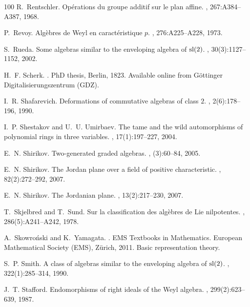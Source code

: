 \documentclass{commat}
\begin{document}
\begin{thebibliography}{100}
R.~Rentschler.
\newblock Op\'{e}rations du groupe additif sur le plan affine.
, 267:A384--A387, 1968.

P.~Revoy.
\newblock Alg\`ebres de {W}eyl en caract\'{e}ristique {$p$}.
, 276:A225--A228, 1973.

S.~Rueda.
\newblock Some algebras similar to the enveloping algebra of {$\rm sl(2)$}.
, 30(3):1127--1152, 2002.

H.~F. Scherk.
.
\newblock PhD thesis, Berlin, 1823.
\newblock Available online from G{\"o}ttinger Digitalisierungszentrum (GDZ).

I.~R. Shafarevich.
\newblock Deformations of commutative algebras of class {$2$}.
, 2(6):178--196, 1990.

I.~P. Shestakov and U.~U. Umirbaev.
\newblock The tame and the wild automorphisms of polynomial rings in three
  variables.
, 17(1):197--227, 2004.

E.~N. Shirikov.
\newblock Two-generated graded algebras.
, (3):60--84, 2005.

E.~N. Shirikov.
\newblock The {J}ordan plane over a field of positive characteristic.
, 82(2):272--292, 2007.

E.~N. Shirikov.
\newblock The {J}ordanian plane.
, 13(2):217--230, 2007.

T.~Skjelbred and T.~Sund.
\newblock Sur la classification des alg\`ebres de {L}ie nilpotentes.
, 286(5):A241--A242, 1978.

A.~Skowro\'{n}ski and K.~Yamagata.
.
\newblock EMS Textbooks in Mathematics. European Mathematical Society (EMS),
  Z\"{u}rich, 2011.
\newblock Basic representation theory.

S.~P. Smith.
\newblock A class of algebras similar to the enveloping algebra of {${\rm
  sl}(2)$}.
, 322(1):285--314, 1990.

J.~T. Stafford.
\newblock Endomorphisms of right ideals of the {W}eyl algebra.
, 299(2):623--639, 1987.


\end{thebibliography}
\end{document}
